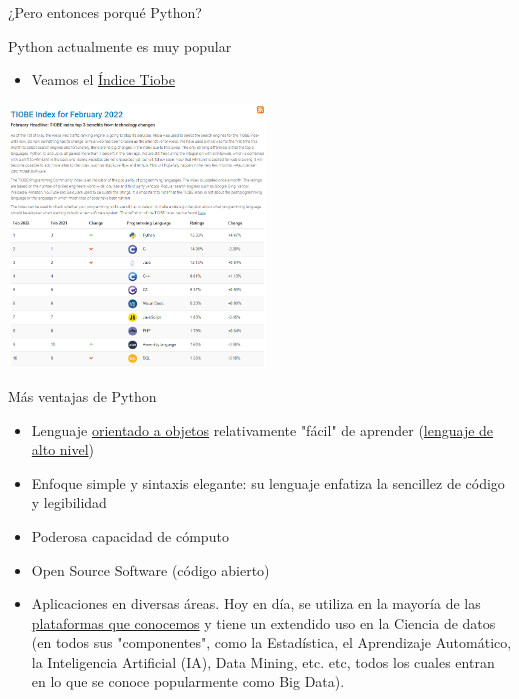 \documentclass{beamer}
\begin{document}
\begin{frame}{¿Pero entonces porqué Python?} \pause
\begin{block}{Python actualmente es muy popular}  \pause
	\begin{itemize}
		\item Veamos el \textcolor{blue}{\href{https://www.tiobe.com/tiobe-index/}{Índice Tiobe}}
	\end{itemize}
\end{block}
\begin{center}
\includegraphics[height=7cm, scale=0.5]{recursos/tiobe_index22.png}
\end{center}
\end{frame}

\begin{frame}{Más ventajas de Python} \pause
\begin{itemize}
	\item Lenguaje \textcolor{blue}{\href{https://www.computerweekly.com/es/definicion/Programacion-orientada-a-objetos-OOP}{orientado a objetos}} relativamente "fácil" de aprender (\textcolor{blue}{\href{https://www.diarlu.com/lenguajes-de-programacion/}{lenguaje de alto nivel}})
	\item Enfoque simple y sintaxis elegante: su lenguaje enfatiza la sencillez de código y legibilidad 
	\item Poderosa capacidad de cómputo
	\item Open Source Software (código abierto)	
	\item Aplicaciones en diversas áreas. Hoy en día, se utiliza en la mayoría de las \textcolor{blue}{\href{https://learn.onemonth.com/es/10-paginas-web-famosas-hechas-con-python/}{plataformas que conocemos}} y tiene un extendido uso en la Ciencia de datos (en todos sus "componentes", como la Estadística, el Aprendizaje Automático, la Inteligencia Artificial (IA), Data Mining, etc. etc, todos los cuales entran en lo que se conoce popularmente como Big Data).
\end{itemize}
\end{frame}
\end{document}
